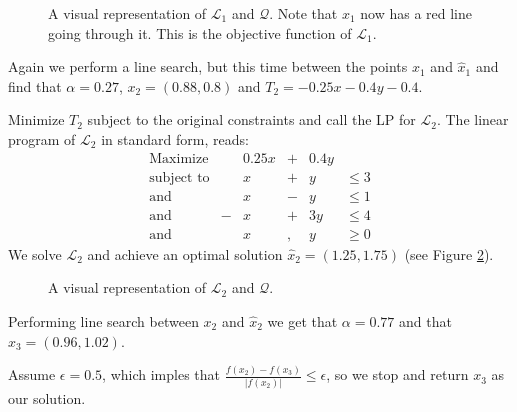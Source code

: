 \begin{figure}[ht!]
\centering

\caption{A visual representation of $\mathcal{L}_1$ and $\mathcal{Q}$.
         Note that $x_1$ now has a red line going through it. This is
         the objective function of $\mathcal{L}_1$.}
\label{fig:lp2}
\end{figure}

Again we perform a line search, but this time between the points $x_1$ and
$\hat{x}_1$ and find that $\alpha = 0.27$, $x_2 = (0.88, 0.8)$ and
$T_2 = -0.25x -0.4y -0.4$.

Minimize $T_2$ subject to the original constraints and call the LP for
$\mathcal{L}_2$.
The linear program of $\mathcal{L}_2$ in standard form, reads:
\[
\begin{array}{lcrcrl}
    \textrm{Maximize}   & & 0.25 x &+& 0.4 y & \\
    \textrm{subject to} & &      x &+&     y & \leq 3 \\
    \textrm{and}        & &      x &-&     y & \leq 1 \\
    \textrm{and}        &-&      x &+&   3 y & \leq 4 \\
    \textrm{and}        & &      x &,&     y & \geq 0
\end{array}
\]
We solve $\mathcal{L}_2$ and achieve an optimal solution $\hat{x}_2
= (1.25, 1.75)$ (see Figure \ref{fig:lp3}).
\begin{figure}[ht!]
\centering

\caption{A visual representation of $\mathcal{L}_2$ and $\mathcal{Q}$.}
\label{fig:lp3}
\end{figure}

Performing line search between $x_2$ and $\hat{x}_2$ we get that
$\alpha = 0.77$ and that $x_3 = (0.96, 1.02)$.


Assume $\epsilon = 0.5$, which imples that
$\frac{f(x_2) - f(x_3)}{|f(x_2)|} \leq \epsilon$, so we stop and return $x_3$
as our solution.
